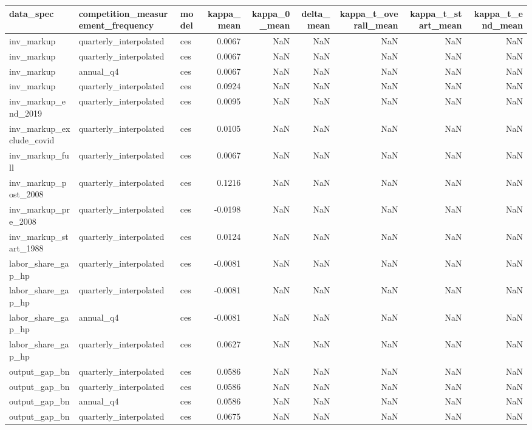 \begin{tabular}{lllrrrrrr}
\toprule
data\_spec & competition\_measurement\_frequency & model & kappa\_mean & kappa\_0\_mean & delta\_mean & kappa\_t\_overall\_mean & kappa\_t\_start\_mean & kappa\_t\_end\_mean \\
\midrule
inv\_markup & quarterly\_interpolated & ces & 0.0067 & NaN & NaN & NaN & NaN & NaN \\
inv\_markup & quarterly\_interpolated & ces & 0.0067 & NaN & NaN & NaN & NaN & NaN \\
inv\_markup & annual\_q4 & ces & 0.0067 & NaN & NaN & NaN & NaN & NaN \\
inv\_markup & quarterly\_interpolated & ces & 0.0924 & NaN & NaN & NaN & NaN & NaN \\
inv\_markup\_end\_2019 & quarterly\_interpolated & ces & 0.0095 & NaN & NaN & NaN & NaN & NaN \\
inv\_markup\_exclude\_covid & quarterly\_interpolated & ces & 0.0105 & NaN & NaN & NaN & NaN & NaN \\
inv\_markup\_full & quarterly\_interpolated & ces & 0.0067 & NaN & NaN & NaN & NaN & NaN \\
inv\_markup\_post\_2008 & quarterly\_interpolated & ces & 0.1216 & NaN & NaN & NaN & NaN & NaN \\
inv\_markup\_pre\_2008 & quarterly\_interpolated & ces & -0.0198 & NaN & NaN & NaN & NaN & NaN \\
inv\_markup\_start\_1988 & quarterly\_interpolated & ces & 0.0124 & NaN & NaN & NaN & NaN & NaN \\
labor\_share\_gap\_hp & quarterly\_interpolated & ces & -0.0081 & NaN & NaN & NaN & NaN & NaN \\
labor\_share\_gap\_hp & quarterly\_interpolated & ces & -0.0081 & NaN & NaN & NaN & NaN & NaN \\
labor\_share\_gap\_hp & annual\_q4 & ces & -0.0081 & NaN & NaN & NaN & NaN & NaN \\
labor\_share\_gap\_hp & quarterly\_interpolated & ces & 0.0627 & NaN & NaN & NaN & NaN & NaN \\
output\_gap\_bn & quarterly\_interpolated & ces & 0.0586 & NaN & NaN & NaN & NaN & NaN \\
output\_gap\_bn & quarterly\_interpolated & ces & 0.0586 & NaN & NaN & NaN & NaN & NaN \\
output\_gap\_bn & annual\_q4 & ces & 0.0586 & NaN & NaN & NaN & NaN & NaN \\
output\_gap\_bn & quarterly\_interpolated & ces & 0.0675 & NaN & NaN & NaN & NaN & NaN \\

\end{tabular}
